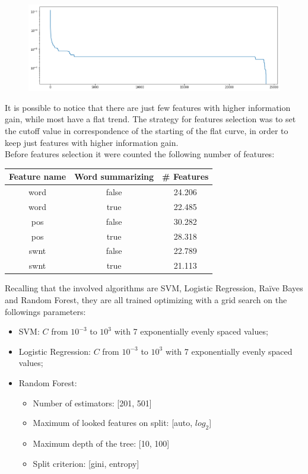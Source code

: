 \begin{figure}[ht]
	\centering
	\includegraphics[width=\textwidth]{figures/conf_matrices/twitter_sent_bpef/bpef_fs_1.png}
	\label{fig:conf2}
\end{figure}

It is possible to notice that there are just few features with higher information gain, while most have a flat trend. The strategy for features selection was to set the cutoff value in correspondence of the starting of the flat curve, in order to keep just features with higher information gain.\\
Before features selection it were counted the following number of features:

\begin{center}
	\begin{tabular}{ c  c  c } 
		\hline
		\textbf{Feature name} & \textbf{Word summarizing} & \textbf{\# Features} \\
		\hline
		word & false & 24.206 \\ 
		\hline
		word & true & 22.485 \\ 
		\hline
		pos & false & 30.282 \\ 
		\hline
		pos & true & 28.318 \\ 
		\hline
		swnt & false & 22.789 \\ 
		\hline
		swnt & true & 21.113 \\ 
		\hline
	\end{tabular}
\end{center}

Recalling that the involved algorithms are SVM, Logistic Regression, Ra{\"i}ve Bayes and Random Forest, they are all trained optimizing with a grid search on the followings parameters:
\begin{itemize}
	\item SVM: $C$ from $10^{-3}$ to $10^3$ with 7 exponentially evenly spaced values;
	\item Logistic Regression: $C$ from $10^{-3}$ to $10^3$ with 7 exponentially evenly spaced values;
	\item Random Forest: 
	\begin{itemize}
		\item Number of estimators: [201, 501]
		\item Maximum of looked features on split: [auto, $log_2$]
		\item Maximum depth of the tree: [10, 100]
		\item Split criterion: [gini, entropy]
	\end{itemize}
\end{itemize}

